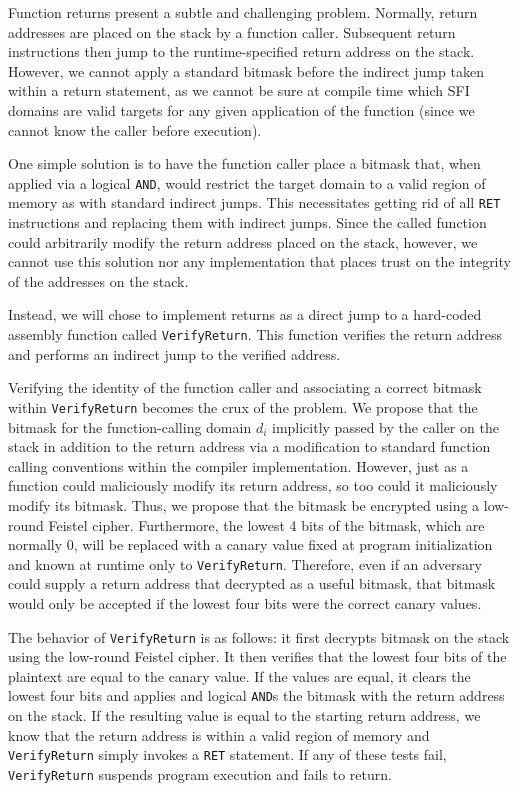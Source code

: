 \documentclass[12pt]{article}
\begin{document}
Function returns present a subtle and challenging problem. Normally, return addresses are placed on the stack by a function caller. Subsequent return instructions then jump to the runtime-specified return address on the stack. However, we cannot apply a standard bitmask before the indirect jump taken within a return statement, as we cannot be sure at compile time which SFI domains are valid targets for any given application of the function (since we cannot know the caller before execution).

One simple solution is to have the function caller place a bitmask that, when applied via a logical \texttt{AND}, would restrict the target domain to a valid region of memory as with standard indirect jumps. This necessitates getting rid of all \texttt{RET} instructions and replacing them with indirect jumps. Since the called function could arbitrarily modify the return address placed on the stack, however, we cannot use this solution nor any implementation that places trust on the integrity of the addresses on the stack.

Instead, we will chose to implement returns as a direct jump to a hard-coded assembly function called \texttt{VerifyReturn}. This function verifies the return address and performs an indirect jump to the verified address.

Verifying the identity of the function caller and associating a correct bitmask within \texttt{VerifyReturn} becomes the crux of the problem. We propose that the bitmask for the function-calling domain $d_i$ implicitly passed by the caller on the stack in addition to the return address via a modification to standard function calling conventions within the compiler implementation. However, just as a function could maliciously modify its return address, so too could it maliciously modify its bitmask. Thus, we propose that the bitmask be encrypted using a low-round Feistel cipher. Furthermore, the lowest 4 bits of the bitmask, which are normally 0, will be replaced with a canary value fixed at program initialization and known at runtime only to \texttt{VerifyReturn}. Therefore, even if an adversary could supply a return address that decrypted as a useful bitmask, that bitmask would only be accepted if the lowest four bits were the correct canary values.

The behavior of \texttt{VerifyReturn} is as follows: it first decrypts bitmask on the stack using the low-round Feistel cipher. It then verifies that the lowest four bits of the plaintext are equal to the canary value. If the values are equal, it clears the lowest four bits and applies and logical \texttt{AND}s the bitmask with the return address on the stack. If the resulting value is equal to the starting return address, we know that the return address is within a valid region of memory and \texttt{VerifyReturn} simply invokes a \texttt{RET} statement. If any of these tests fail, \texttt{VerifyReturn} suspends program execution and fails to return.
\end{document}
